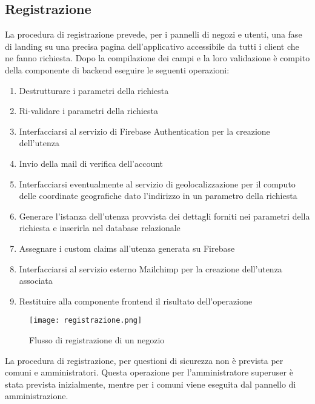 \subsection{Registrazione}
La procedura di registrazione prevede, per i pannelli di negozi e utenti, una fase di landing su una precisa pagina dell'applicativo accessibile da tutti i client che ne fanno richiesta. Dopo la compilazione dei campi e la loro validazione è compito della componente di backend eseguire le seguenti operazioni:
\begin{enumerate}
    \item Destrutturare i parametri della richiesta 
    \item Ri-validare i parametri della richiesta
    \item Interfacciarsi al servizio di Firebase Authentication per la creazione dell'utenza
    \item Invio della mail di verifica dell'account
    \item Interfacciarsi eventualmente al servizio di geolocalizzazione per il computo delle coordinate geografiche dato l'indirizzo in un parametro della richiesta
    \item Generare l'istanza dell'utenza provvista dei dettagli forniti nei parametri della richiesta e inserirla nel database relazionale 
    \item Assegnare i custom claims all'utenza generata su Firebase
    \item Interfacciarsi al servizio esterno Mailchimp per la creazione dell'utenza associata
    \item Restituire alla componente frontend il risultato dell'operazione
\end{enumerate}
\begin{figure}[h!]
    \centering
    \texttt{[image: registrazione.png]}
    \caption{Flusso di registrazione di un negozio}
\end{figure}
\FloatBarrier
La procedura di registrazione, per questioni di sicurezza non è prevista per comuni e amministratori. Questa operazione per l'amministratore superuser è stata prevista inizialmente, mentre per i comuni viene eseguita dal pannello di amministrazione.
\newpage
